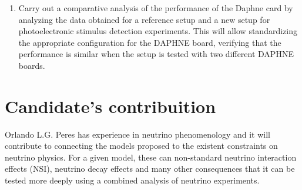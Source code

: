 \documentclass[a4paper,10pt,epsfig,epsf,amsfonts,amsmath]{article}
\begin{document}
\begin{enumerate}
    \item Carry out a comparative analysis of the performance of the Daphne card by analyzing the data obtained for a reference setup and a new setup for photoelectronic stimulus detection experiments. This will allow standardizing the appropriate configuration for the DAPHNE board, verifying that the performance is similar when the setup is tested with two different DAPHNE boards.
    
    
\end{enumerate}



\section{Candidate's contribuition} 


  Orlando L.G. Peres has experience in neutrino phenomenology and it
  will contribute to connecting the models proposed to the existent
  constraints on neutrino physics. For a given model, these can
  non-standard neutrino interaction effects (NSI), neutrino decay
  effects and many other consequences that it can be tested more
  deeply using a combined analysis of neutrino experiments.
  
\end{document}
